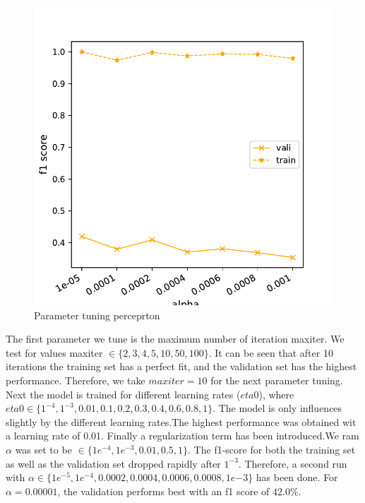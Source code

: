 \documentclass[11pt]{article}
\begin{document}
\begin{figure}[t]
\begin{minipage}[t]{0.33\textwidth}
\end{minipage}
\begin{minipage}[t]{0.33\textwidth}
\includegraphics[width=1\linewidth]{amazon/Per_alpha2.pdf}
\end{minipage}
\caption{Parameter tuning perceprton}
\label{Fig::Perceptron parametertuning}
\end{figure}
%
The first parameter we tune is the maximum number of iteration maxiter. We test for values  maxiter $\in \{2, 3, 4, 5, 10, 50, 100\}$. It can be seen that after 10 iterations the training set has a perfect fit, and the validation set has the highest performance. Therefore, we take $maxiter=10$ for the next parameter tuning.
\newline
Next the model is trained for different learning rates ($eta0$), where $ eta0 \in \{1^{-4}, 1^{-3}, 0.01, 0.1, 0.2, 0.3, 0.4, 0.6, 0.8, 1\} $. The model is only influences slightly by the different learning rates.The highest performance was obtained wit a learning rate of 0.01. 
\newline
Finally a regularization term has been introduced.We ram $\alpha$ was set to be $ \in \{ 1e^{-4}, 1e^{-3}, 0.01, 0.5, 1\}$. The f1-score for both the training set as well as the validation set dropped rapidly after $1^{-3}$. Therefore, a second run with $\alpha \in  \{1e^{-5}, 1e^{-4}, 0.0002, 0.0004, 0.0006, 0.0008, 1e{-3}\}$ has been done. For $\alpha=0.00001$, the validation performs best with an f1 score of  $42.0\%$. 
\end{document}
